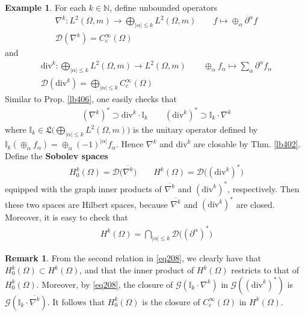 \documentclass[12pt,b5paper,notitlepage]{article}
\theoremstyle{definition}
\newtheorem{eg}[df]{Example}
\newtheorem{rem}[df]{Remark}
\theoremstyle{plain}
\newcommand{\fk}{\mathfrak}
\newcommand{\ovl}{\overline}
\newcommand{\Dom}{\mathscr{D}}
\newcommand{\Nbb}{\mathbb N}
\newcommand{\Ibb}{\mathbb I}
\newcommand{\dive}{\mathrm{div}}
\newcommand{\SG}{\mathscr G}
\numberwithin{equation}{section}
\begin{document}
\begin{eg}
For each $k\in\Nbb$,  define unbounded operators
\begin{gather*}
\nabla^k:L^2(\Omega,m)\rightarrow \bigoplus_{|\alpha|\leq k}L^2(\Omega,m)\qquad f\mapsto\oplus_\alpha \partial^\alpha f\\
\Dom(\nabla^k)=C_c^\infty(\Omega)
\end{gather*}
and
\begin{gather*}
\dive^k:\bigoplus_{|\alpha|\leq k}L^2(\Omega,m)\rightarrow  L^2(\Omega,m)\qquad\oplus_\alpha f_\alpha\mapsto\sum_\alpha \partial^\alpha f_\alpha\\
\Dom(\dive^k)=\bigoplus_{|\alpha|\leq k}C_c^\infty(\Omega)
\end{gather*}
Similar to Prop. \ref{lb406}, one easily checks that
\begin{align}\label{eq208}
(\nabla^k)^*\supset \dive^k\cdot \Ibb_k\qquad (\dive^k)^*\supset \Ibb_k\cdot\nabla^k
\end{align}
where $\Ibb_k\in\fk L\big(\bigoplus_{|\alpha|\leq k}L^2(\Omega,m)\big)$ is the unitary operator defined by $\Ibb_k(\oplus_\alpha f_\alpha)=\oplus_\alpha (-1)^{|\alpha|}f_\alpha$. Hence $\nabla^k$ and $\dive^k$ are closable by Thm. \ref{lb402}. Define the  \textbf{Sobolev spaces} 
\begin{align*}
H^k_0(\Omega)=\Dom\big(\ovl{\nabla^k}\big)\qquad H^k(\Omega)=\Dom\big((\dive^k)^*\big)
\end{align*}
equipped with the graph inner products of $\ovl{\nabla^k}$ and $(\dive^k)^*$, respectively. Then these two spaces are Hilbert spaces, because $\ovl{\nabla^k}$ and $(\dive^k)^*$ are closed. Moreover, it is easy to check that
\begin{align*}
H^k(\Omega)=\bigcap_{|\alpha|\leq k}\Dom\big((\partial^\alpha)^*\big)
\end{align*}
\end{eg}



\begin{rem}
From the second relation in \eqref{eq208}, we clearly have that $H^k_0(\Omega)\subset H^k(\Omega)$, and that the inner product of $H^k(\Omega)$ restricts to that of $H^k_0(\Omega)$. Moreover, by \eqref{eq208}, the closure of $\SG(\Ibb_k\cdot\nabla^k)$ in $\SG((\dive^k)^*)$ is $\SG(\Ibb_k\cdot\ovl{\nabla^k})$. It follows that $H^k_0(\Omega)$ is the closure of $C_c^\infty(\Omega)$ in $H^k(\Omega)$. 
\end{rem}
\end{document}
